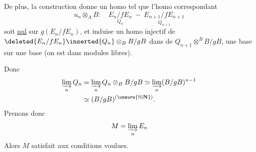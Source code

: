 De plus, la construction donne un homo
tel que l'homo correspondant
\[
u_n\otimes_A B:\quad\underset{Q_n}{E_n/fE_n}\ -\ \underset{Q_{n+1}}{E_{n+1}/fE_{n+1}}
\]
soit \uline{nul} sur $g(E_n/fE_n)$, et induise un
homo injectif de  $\deleted{E_n/fE_n}\inserted{Q_n}\otimes_B B/gB$ dans
de $Q_{n+1}\otimes^B B/gB$,  une base sur
une base (on est dans modules libres).

Donc
\[
\begin{aligned}
\varinjlim_n Q_n&=\varinjlim_n Q_n\otimes_B B/gB\simeq\varinjlim_n(B/gB)^{n-1}\\
&\simeq(B/gB)^{(\unsure{\mathbb N|\mathbf N})}.
\end{aligned}
\]
Prenons donc
\[
M=\varinjlim_n E_n
\]
Alors $M$ satisfait aux conditions voulues.

